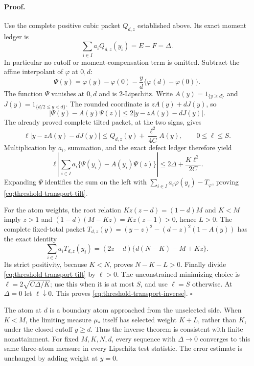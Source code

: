 \paragraph{Proof.}
Use the complete positive cubic packet \(Q_{d,z}\) established above.
Its exact moment ledger is
\[
 \sum_{i\in I}a_iQ_{d,z}(y_i)=E-F=\Delta.
\]
In particular no cutoff or moment-compensation term is omitted.
Subtract the affine interpolant of \(\varphi\) at \(0,d\):
\[
 \Psi(y)=\varphi(y)-\varphi(0)
                 -\frac{y}{d}\{\varphi(d)-\varphi(0)\}.
\]
The function \(\Psi\) vanishes at \(0,d\) and is \(2\)-Lipschitz.
Write \(A(y)=1_{\{y\ge d\}}\) and
\(J(y)=1_{\{d/2\le y<d\}}\).  The rounded coordinate is
\(zA(y)+dJ(y)\), so
\[
 |\Psi(y)-A(y)\Psi(z)|
 \le 2|y-zA(y)-dJ(y)|.
\]
The already proved complete tilted packet, at the two signs, gives
\[
 \ell|y-zA(y)-dJ(y)|
 \le Q_{d,z}(y)+\frac{\ell^2}{4C}A(y),
 \qquad 0\le\ell\le S.
\]
Multiplication by \(a_i\), summation, and the exact defect ledger
therefore yield
\[
 \ell\left|\sum_{i\in I}a_i\{\Psi(y_i)-A(y_i)\Psi(z)\}\right|
 \le2\Delta+\frac{K\ell^2}{2C}.
\]
Expanding \(\Psi\) identifies the sum on the left with
\(\sum_{i\in I}a_i\varphi(y_i)-T_\varphi\), proving
\eqref{eq:threshold-transport-tilt}.

For the atom weights, the root relation
\(Kz(z-d)=(1-d)M\) and \(K<M\) imply \(z>1\) and
\((1-d)(M-Kz)=Kz(z-1)>0\), hence \(L>0\).
The complete fixed-total packet
\(T_{d,z}(y)=(y-z)^2-(d-z)^2(1-A(y))\) has the exact identity
\[
 \sum_{i\in I}a_i T_{d,z}(y_i)
 =(2z-d)\{d(N-K)-M+Kz\}.
\]
Its strict positivity, because \(K<N\), proves \(N-K-L>0\).
Finally divide \eqref{eq:threshold-transport-tilt} by \(\ell>0\).
The unconstrained minimizing choice is
\(\ell=2\sqrt{C\Delta/K}\); use this when it is at most \(S\),
and use \(\ell=S\) otherwise.  At \(\Delta=0\) let
\(\ell\downarrow0\).  This proves \eqref{eq:threshold-transport-inverse}.
\hfill\(\square\)

The atom at \(d\) is a boundary atom approached from the unselected
side.  When \(K<M\), the limiting measure \(\mu_*\) itself has selected
weight \(K+L\), rather than \(K\), under the closed cutoff \(y\ge d\).
Thus the inverse theorem is consistent with finite nonattainment.
For fixed \(M,K,N,d\), every sequence with \(\Delta\to0\) converges
to this same three-atom measure in every Lipschitz test statistic.
The error estimate is unchanged by adding weight at \(y=0\).

